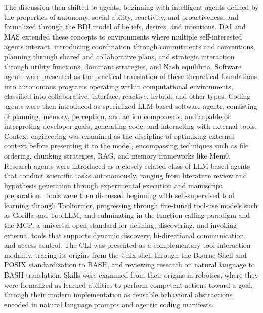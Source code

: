 \documentclass[
english,                 %
bibtex,                  %
includeExtraAbstracts, %
]{kththesis}
\numberwithin{listing}{chapter}
\begin{document}
The discussion then shifted to agents, beginning with intelligent agents defined by the properties of autonomy, social ability, reactivity, and proactiveness, and formalized through the \gls{BDI} model of beliefs, desires, and intentions. \Gls{DAI} and \gls{MAS} extended these concepts to environments where multiple self-interested agents interact, introducing coordination through commitments and conventions, planning through shared and collaborative plans, and strategic interaction through utility functions, dominant strategies, and Nash equilibria. Software agents were presented as the practical translation of these theoretical foundations into autonomous programs operating within computational environments, classified into collaborative, interface, reactive, hybrid, and other types. Coding agents were then introduced as specialized \gls{LLM}-based software agents, consisting of planning, memory, perception, and action components, and capable of interpreting developer goals, generating code, and interacting with external tools. Context engineering was examined as the discipline of optimizing external context before presenting it to the model, encompassing techniques such as file ordering, chunking strategies, \gls{RAG}, and memory frameworks like Mem0. Research agents were introduced as a closely related class of \gls{LLM}-based agents that conduct scientific tasks autonomously, ranging from literature review and hypothesis generation through experimental execution and manuscript preparation. Tools were then discussed beginning with self-supervised tool learning through Toolformer, progressing through fine-tuned tool-use models such as Gorilla and Tool\gls{LLM}, and culminating in the function calling paradigm and the \gls{MCP}, a universal open standard for defining, discovering, and invoking external tools that supports dynamic discovery, bi-directional communication, and access control. The \gls{CLI} was presented as a complementary tool interaction modality, tracing its origins from the Unix shell through the Bourne Shell and \gls{POSIX} standardization to \gls{BASH}, and reviewing research on natural language to \gls{BASH} translation. Skills were examined from their origins in robotics, where they were formalized as learned abilities to perform competent actions toward a goal, through their modern implementation as reusable behavioral abstractions encoded in natural language prompts and agentic coding manifests.
\end{document}
